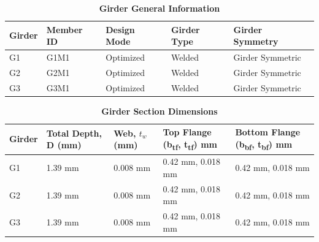 \documentclass[12pt,a4paper]{report}
\numberwithin{table}{chapter}
\numberwithin{figure}{chapter}
\begin{document}
\newpage

\vspace{0.4em}
\noindent
            
\vspace{4pt}
\begin{longtable}{|L{2.2cm}|L{1.8cm}|p{3.8cm}|p{3.8cm}|p{3.8cm}|}
\caption{\textbf{Girder General Information}}
\\
\hline
\textbf{Girder} & \textbf{Member ID} & \textbf{Design Mode} & \textbf{Girder Type} & \textbf{Girder Symmetry} \\[6pt]
\hline
G1 & G1M1 & Optimized & Welded & Girder Symmetric \\[8pt]
\hline
G2 & G2M1 & Optimized & Welded & Girder Symmetric \\[8pt]
\hline
G3 & G3M1 & Optimized & Welded & Girder Symmetric \\[8pt]
\hline
\end{longtable}

\vspace{0.6em}

\vspace{4pt}
\begin{longtable}{|L{1.8cm}|L{2.3cm}|L{1.8cm}|p{4.8cm}|p{4.8cm}|}
\caption{\textbf{Girder Section Dimensions}}
\\
\hline
\textbf{Girder} & \textbf{Total Depth, D (mm)} & \textbf{Web, $t_w$ (mm)} & \textbf{Top Flange (b\textsubscript{tf}, t\textsubscript{tf}) mm} & \textbf{Bottom Flange (b\textsubscript{bf}, t\textsubscript{bf}) mm} \\[6pt]
\hline
G1 & 1.39 mm & 0.008 mm & 0.42 mm, 0.018 mm & 0.42 mm, 0.018 mm \\[8pt]
\hline
G2 & 1.39 mm & 0.008 mm & 0.42 mm, 0.018 mm & 0.42 mm, 0.018 mm \\[8pt]
\hline
G3 & 1.39 mm & 0.008 mm & 0.42 mm, 0.018 mm & 0.42 mm, 0.018 mm \\[8pt]
\hline
\end{longtable}

\vspace{0.6em}
\end{document}
